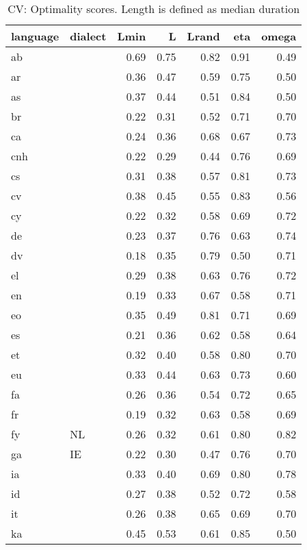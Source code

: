 \begin{table}[H]
\centering
\caption{CV: Optimality scores. Length is defined as median duration} 
\label{tab:opt_scores_cv_medianDuration}
\begin{tabular}{llrrrrr}
  \hline
language & dialect & Lmin & L & Lrand & eta & omega \\ 
  \hline
ab &  & 0.69 & 0.75 & 0.82 & 0.91 & 0.49 \\ 
  ar &  & 0.36 & 0.47 & 0.59 & 0.75 & 0.50 \\ 
  as &  & 0.37 & 0.44 & 0.51 & 0.84 & 0.50 \\ 
  br &  & 0.22 & 0.31 & 0.52 & 0.71 & 0.70 \\ 
  ca &  & 0.24 & 0.36 & 0.68 & 0.67 & 0.73 \\ 
  cnh &  & 0.22 & 0.29 & 0.44 & 0.76 & 0.69 \\ 
  cs &  & 0.31 & 0.38 & 0.57 & 0.81 & 0.73 \\ 
  cv &  & 0.38 & 0.45 & 0.55 & 0.83 & 0.56 \\ 
  cy &  & 0.22 & 0.32 & 0.58 & 0.69 & 0.72 \\ 
  de &  & 0.23 & 0.37 & 0.76 & 0.63 & 0.74 \\ 
  dv &  & 0.18 & 0.35 & 0.79 & 0.50 & 0.71 \\ 
  el &  & 0.29 & 0.38 & 0.63 & 0.76 & 0.72 \\ 
  en &  & 0.19 & 0.33 & 0.67 & 0.58 & 0.71 \\ 
  eo &  & 0.35 & 0.49 & 0.81 & 0.71 & 0.69 \\ 
  es &  & 0.21 & 0.36 & 0.62 & 0.58 & 0.64 \\ 
  et &  & 0.32 & 0.40 & 0.58 & 0.80 & 0.70 \\ 
  eu &  & 0.33 & 0.44 & 0.63 & 0.73 & 0.60 \\ 
  fa &  & 0.26 & 0.36 & 0.54 & 0.72 & 0.65 \\ 
  fr &  & 0.19 & 0.32 & 0.63 & 0.58 & 0.69 \\ 
  fy & NL & 0.26 & 0.32 & 0.61 & 0.80 & 0.82 \\ 
  ga & IE & 0.22 & 0.30 & 0.47 & 0.76 & 0.70 \\ 
  ia &  & 0.33 & 0.40 & 0.69 & 0.80 & 0.78 \\ 
  id &  & 0.27 & 0.38 & 0.52 & 0.72 & 0.58 \\ 
  it &  & 0.26 & 0.38 & 0.65 & 0.69 & 0.70 \\ 
  ka &  & 0.45 & 0.53 & 0.61 & 0.85 & 0.50 \\ 

\end{tabular}
\end{table}

